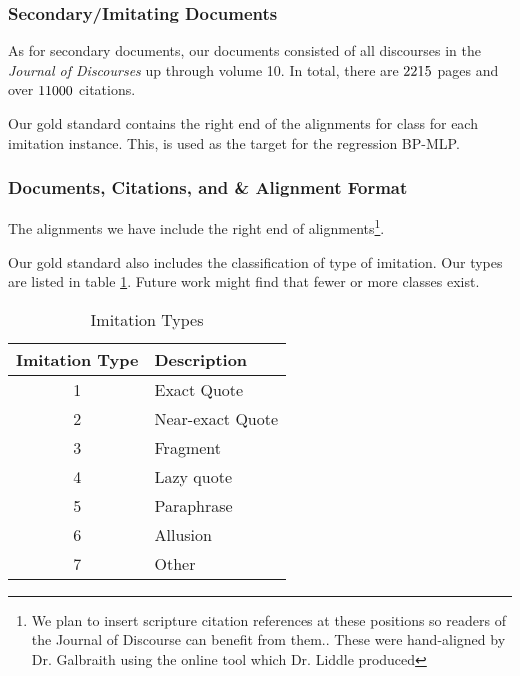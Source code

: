 \subsubsection{Secondary/Imitating Documents}
As for secondary documents, our documents consisted of all discourses in the \textit{Journal of Discourses} up through volume 10. In total, there are $2215$ pages and over $11000$ citations.

Our gold standard contains the right end of the alignments for class for each imitation instance. This, is used as the target for the regression BP-MLP. %


\subsubsection{Documents, Citations, and \& Alignment Format}
The alignments we have include the right end of alignments\footnote{We plan to insert scripture citation references at these positions so readers of the Journal of Discourse can benefit from them.. These were hand-aligned by Dr. Galbraith using the online tool which Dr. Liddle produced}.

Our gold standard also includes the classification of type of imitation. Our types are listed in table \ref{tab:imitation-types}. Future work might find that fewer or more classes exist.

\begin{table}[center]
	\begin{center}
		\begin{tabular}{|c|l|} \hline
			\textbf{Imitation Type}	& \textbf{Description}		\\ \hline \hline
			1						& Exact Quote				\\ \hline
			2						& Near-exact Quote			\\ \hline
			3						& Fragment					\\ \hline
			4						& Lazy quote				\\ \hline
			5						& Paraphrase				\\ \hline
			6						& Allusion					\\ \hline
			7						& Other						\\ \hline
		\end{tabular}
	\end{center}
	
	\caption{Imitation Types}
	\label{tab:imitation-types}
\end{table}

